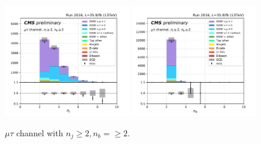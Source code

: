 \begin{figure}[ht]
    \includegraphics[width=0.49\textwidth]{chapters/Analysis/sectionPlots/figures/kinematics_pickles/mutau/2b/mutau_2b_nJets.pdf}
    \includegraphics[width=0.49\textwidth]{chapters/Analysis/sectionPlots/figures/kinematics_pickles/mutau/2b/mutau_2b_nBJets.pdf}
    
    \caption{$\mu\tau$ channel with $n_j\geq2, n_b=\geq2$.}
\end{figure}


